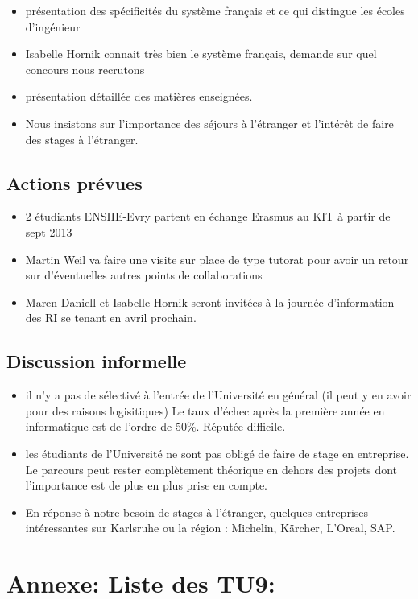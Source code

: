 \documentclass[11pt]{article}
\begin{document}
\begin{itemize}
\item présentation des spécificités du système français et ce qui distingue les écoles d'ingénieur
\item Isabelle Hornik connait très bien le système français, demande sur quel concours nous recrutons
\item présentation détaillée des matières enseignées.
\item Nous insistons sur l'importance des séjours à l'étranger et l'intérêt de faire des stages à l'étranger.
\end{itemize}
\subsection{Actions prévues}
\label{sec-2-4}


\begin{itemize}
\item 2 étudiants ENSIIE-Evry partent en échange Erasmus au KIT à partir de sept 2013
\item Martin Weil va faire une visite sur place de type tutorat pour avoir un retour sur d'éventuelles autres points de collaborations
\item Maren Daniell et Isabelle Hornik seront invitées à la journée d'information des RI se tenant en avril prochain.
\end{itemize}
\subsection{Discussion informelle}
\label{sec-2-5}


\begin{itemize}
\item il n'y a pas de sélectivé à l'entrée de l'Université en général (il peut y en avoir pour des raisons logisitiques)
  Le taux d'échec après la première année en informatique est de l'ordre de 50\%. Réputée difficile.
\item les étudiants de l'Université ne sont pas obligé de faire de stage en entreprise. Le parcours peut rester complètement théorique en dehors des projets dont l'importance est de plus en plus prise en compte.
\item En réponse à notre besoin de stages à l'étranger, 
  quelques entreprises intéressantes sur Karlsruhe ou la région : Michelin, Kärcher, L'Oreal, SAP.
\end{itemize}
\section{Annexe: Liste des TU9:}
\label{sec-3}
\end{document}
